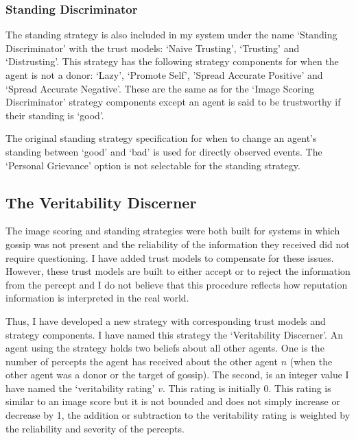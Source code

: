 \documentclass[]{final_report}
\begin{document}
\subsubsection{Standing Discriminator}
The standing strategy is also included in my system under the name `Standing Discriminator' with the trust models: `Naive Trusting', `Trusting' and `Distrusting'. This strategy has the following strategy components for when the agent is not a donor: `Lazy', `Promote Self', 'Spread Accurate Positive' and `Spread Accurate Negative'. These are the same as for the `Image Scoring Discriminator' strategy components except an agent is said to be trustworthy if their standing is `good'.\par
The original standing strategy specification for when to change an agent's standing between `good' and `bad' is used for directly observed events. The `Personal Grievance' option is not selectable for the standing strategy.

\subsection{The Veritability Discerner}
The image scoring and standing strategies were both built for systems in which gossip was not present and the reliability of the information they received did not require questioning. I have added trust models to compensate for these issues. However, these trust models are built to either accept or to reject the information from the percept and I do not believe that this procedure reflects how reputation information is interpreted in the real world.\par 
Thus, I have developed a new strategy with corresponding trust models and strategy components. I have named this strategy the `Veritability Discerner'. An agent using the strategy holds two beliefs about all other agents. One is the number of percepts the agent has received about the other agent $n$ (when the other agent was a donor or the target of gossip). The second, is an integer value  I have named the `veritability rating' $v$. This rating is initially 0. This rating is similar to an image score but it is not bounded and does not simply increase or decrease by 1, the addition or subtraction to the veritability rating is weighted by the reliability and severity of the percepts.\par 
\end{document}
